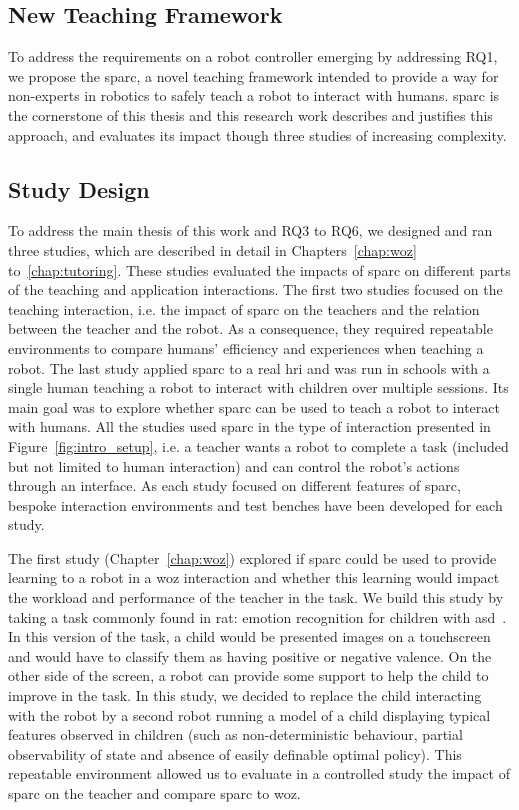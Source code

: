 \subsection{New Teaching Framework}

To address the requirements on a robot controller emerging by addressing RQ1, we propose the \gls{sparc}, a novel teaching framework intended to provide a way for non-experts in robotics to safely teach a robot to interact with humans. \gls{sparc} is the cornerstone of this thesis and this research work describes and justifies this approach, and evaluates its impact though three studies of increasing complexity.

\subsection{Study Design} 

To address the main thesis of this work and RQ3 to RQ6, we designed and ran three studies, which are described in detail in Chapters~\ref{chap:woz} to~\ref{chap:tutoring}. These studies evaluated the impacts of \gls{sparc} on different parts of the teaching and application interactions. The first two studies focused on the teaching interaction, i.e. the impact of \gls{sparc} on the teachers and the relation between the teacher and the robot. As a consequence, they required repeatable environments to compare humans' efficiency and experiences when teaching a robot. The last study applied \gls{sparc} to a real \gls{hri} and was run in schools with a single human teaching a robot to interact with children over multiple sessions. Its main goal was to explore whether \gls{sparc} can be used to teach a robot to interact with humans. All the studies used \gls{sparc} in the type of interaction presented in Figure~\ref{fig:intro_setup}, i.e. a teacher wants a robot to complete a task (included but not limited to human interaction) and can control the robot's actions through an interface. As each study focused on different features of \gls{sparc}, bespoke interaction environments and test benches have been developed for each study.

The first study (Chapter~\ref{chap:woz}) explored if \gls{sparc} could be used to provide learning to a robot in a \gls{woz} interaction and whether this learning would impact the workload and performance of the teacher in the task. We build this study by taking a task commonly found in \gls{rat}: emotion recognition for children with \gls{asd}~\citep{dautenhahn2004towards}. In this version of the task, a child would be presented images on a touchscreen and would have to classify them as having positive or negative valence. On the other side of the screen, a robot can provide some support to help the child to improve in the task. In this study, we decided to replace the child interacting with the robot by a second robot running a model of a child displaying typical features observed in children (such as non-deterministic behaviour, partial observability of state and absence of easily definable optimal policy). This repeatable environment allowed us to evaluate in a controlled study the impact of \gls{sparc} on the teacher and compare \gls{sparc} to \gls{woz}.

